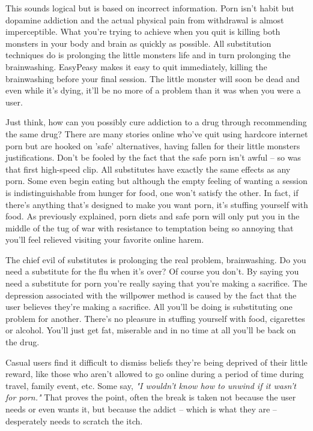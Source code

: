 \documentclass[easypeasy.tex]{subfiles}
\begin{document}
This sounds logical but is based on incorrect information. Porn isn't habit but dopamine addiction and the actual physical pain from withdrawal is almost imperceptible. What you're trying to achieve when you quit is killing both monsters in your body and brain as quickly as possible. All substitution techniques do is prolonging the little monsters life and in turn prolonging the brainwashing. EasyPeasy makes it easy to quit immediately, killing the brainwashing before your final session. The little monster will soon be dead and even while it's dying, it'll be no more of a problem than it was when you were a user.

Just think, how can you possibly cure addiction to a drug through recommending the same drug? There are many stories online who've quit using hardcore internet porn but are hooked on 'safe' alternatives, having fallen for their little monsters justifications. Don't be fooled by the fact that the safe porn isn't awful -- so was that first high-speed clip. All substitutes have exactly the same effects as any porn. Some even begin eating but although the empty feeling of wanting a session is indistinguishable from hunger for food, one won't satisfy the other. In fact, if there's anything that's designed to make you want porn, it's stuffing yourself with food. As previously explained, porn diets and safe porn will only put you in the middle of the tug of war with resistance to temptation being so annoying that you'll feel relieved visiting your favorite online harem.

The chief evil of substitutes is prolonging the real problem, brainwashing. Do you need a substitute for the flu when it's over? Of course you don't. By saying you need a substitute for porn you're really saying that you're making a sacrifice. The depression associated with the willpower method is caused by the fact that the user believes they're making a sacrifice. All you'll be doing is substituting one problem for another. There's no pleasure in stuffing yourself with food, cigarettes or alcohol. You'll just get fat, miserable and in no time at all you'll be back on the drug.

Casual users find it difficult to dismiss beliefs they're being deprived of their little reward, like those who aren't allowed to go online during a period of time during travel, family event, etc. Some say, \textit{"I wouldn't know how to unwind if it wasn't for porn."} That proves the point, often the break is taken not because the user needs or even wants it, but because the addict -- which is what they are -- desperately needs to scratch the itch.
\end{document}
